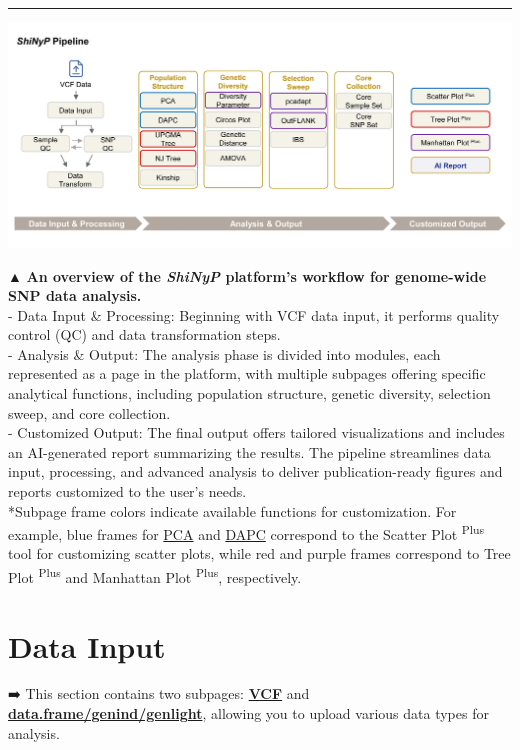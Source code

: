\documentclass[
]{book}
\begin{document}
\begin{center}\rule{0.5\linewidth}{0.5pt}\end{center}

\includegraphics{images/Fig. 1-02.jpg}

▲ \textbf{An overview of the {\emph{ShiNyP}} platform's workflow for genome-wide SNP data analysis.}\\
- Data Input \& Processing: Beginning with VCF data input, it performs quality control (QC) and data transformation steps.\\
- Analysis \& Output: The analysis phase is divided into modules, each represented as a page in the platform, with multiple subpages offering specific analytical functions, including population structure, genetic diversity, selection sweep, and core collection.\\
- Customized Output: The final output offers tailored visualizations and includes an AI-generated report summarizing the results. The pipeline streamlines data input, processing, and advanced analysis to deliver publication-ready figures and reports customized to the user's needs.\\
*Subpage frame colors indicate available functions for customization. For example, blue frames for \ul{PCA} and \ul{DAPC} correspond to the Scatter Plot \textsuperscript{Plus} tool for customizing scatter plots, while red and purple frames correspond to Tree Plot \textsuperscript{Plus} and Manhattan Plot \textsuperscript{Plus}, respectively.

\chapter{Data Input}\label{sec-data-input}

➡️ This section contains two subpages: \ul{\textbf{VCF}} and \ul{\textbf{data.frame/genind/genlight}}, allowing you to upload various data types for analysis.
\end{document}
